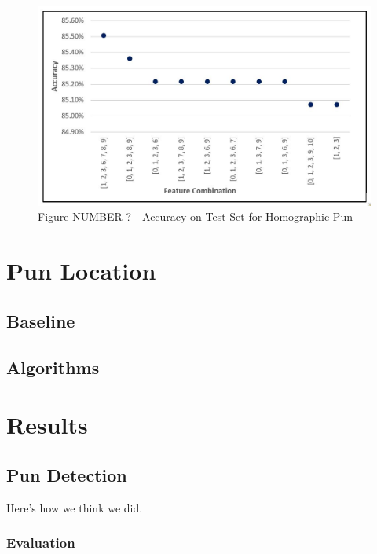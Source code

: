 \documentclass{article}
\begin{document}
\begin{figure}
  \includegraphics{figures/Accuracy_on_Test_Set_for_Homographic_Pun.JPG}
  \caption{Figure NUMBER ? - Accuracy on Test Set for Homographic Pun}
  \label{fig:boat1}
\end{figure}




\section{Pun Location}
\label{pun_location}

\subsection{Baseline}

\subsection{Algorithms}

\section{Results}
\label{results}

\subsection{Pun Detection}
Here's how we think we did.
\subsubsection{Evaluation}
\end{document}
